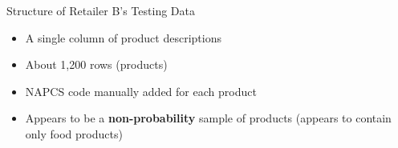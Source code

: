 

\begin{frame}{\LARGE Structure of Retailer B's {\color{red}Testing} Data}

\large

\begin{itemize}
\item
	A single column of product descriptions
	\vskip 0.5cm
\item
	About 1,200 rows (products)
	\vskip 0.5cm
\item
	NAPCS code manually added for each product
	\vskip 0.5cm
\item
	Appears to be a \textbf{\Large non-probability} sample of products
	\vskip 0.05cm
	{\normalsize(appears to contain only food products)}
	\vskip 0.3cm
\end{itemize}

\end{frame}
\normalsize

